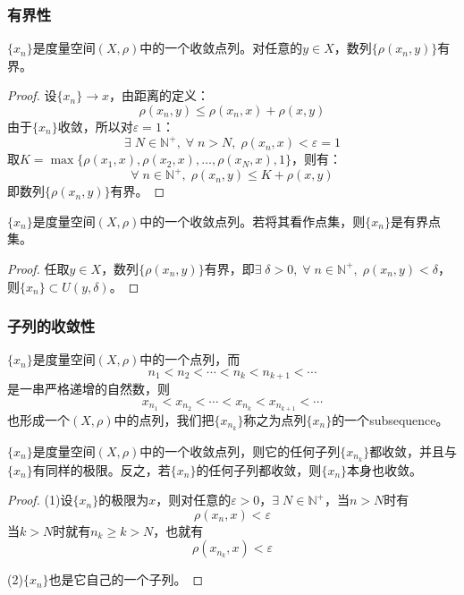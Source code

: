 \subsubsection{有界性}
\begin{theorem}
	$\{x_n\}$是度量空间$(X,\rho)$中的一个收敛点列。对任意的$ y\in X$，数列$\{\rho(x_n,y)\}$有界。
\end{theorem}
\begin{proof}
	设$\{x_n\}\to x$，由距离的定义：
	\begin{equation*}
		\rho(x_n,y)\leqslant\rho(x_n,x)+\rho(x,y)
	\end{equation*}
	由于$\{x_n\}$收敛，所以对$\varepsilon=1$：
	\begin{equation*}
		\exists\;N\in\mathbb{N}^+,\;\forall\;n>N,\;\rho(x_n,x)<\varepsilon=1
	\end{equation*}
	取$K=\max\{\rho(x_1,x),\rho(x_2,x),\dots,\rho(x_N,x),1\}$，则有：
	\begin{equation*}
		\forall\;n\in\mathbb{N}^+,\;\rho(x_n,y)\leqslant K+\rho(x,y)
	\end{equation*}
	即数列$\{\rho(x_n,y)\}$有界。
\end{proof}
\begin{corollary}
	$\{x_n\}$是度量空间$(X,\rho)$中的一个收敛点列。若将其看作点集，则$\{x_n\}$是有界点集。
\end{corollary}
\begin{proof}
	任取$y\in X$，数列$\{\rho(x_n,y)\}$有界，即$\exists\;\delta>0,\;\forall\;n\in\mathbb{N}^+,\;\rho(x_n,y)<\delta$，则$\{x_n\}\subset U(y,\delta)$。
\end{proof}
\subsubsection{子列的收敛性}
\begin{definition}
	$\{x_n\}$是度量空间$(X,\rho)$中的一个点列，而
	\begin{equation*}
		n_1<n_2<\cdots<n_k<n_{k+1}<\cdots
	\end{equation*}
	是一串严格递增的自然数，则
	\begin{equation*}
		x_{n_1}<x_{n_2}<\cdots<x_{n_k}<x_{n_{k+1}}<\cdots
	\end{equation*}
	也形成一个$(X,\rho)$中的点列，我们把$\{x_{n_k}\}$称之为点列$\{x_n\}$的一个\gls{subsequence}。
\end{definition}
\begin{theorem}
	$\{x_n\}$是度量空间$(X,\rho)$中的一个收敛点列，则它的任何子列$\{x_{n_k}\}$都收敛，并且与$\{x_n\}$有同样的极限。反之，若$\{x_n\}$的任何子列都收敛，则$\{x_n\}$本身也收敛。
\end{theorem}
\begin{proof}
	(1)设$\{x_n\}$的极限为$x$，则对任意的$\varepsilon>0$，$\exists\; N\in\mathbb{N}^+$，当$n>N$时有
	\begin{equation*}
		\rho(x_n,x)<\varepsilon
	\end{equation*}
	当$k>N$时就有$n_k\geqslant k>N$，也就有
	\begin{equation*}
		\rho(x_{n_k},x)<\varepsilon
	\end{equation*}\par
	(2)$\{x_n\}$也是它自己的一个子列。
\end{proof}